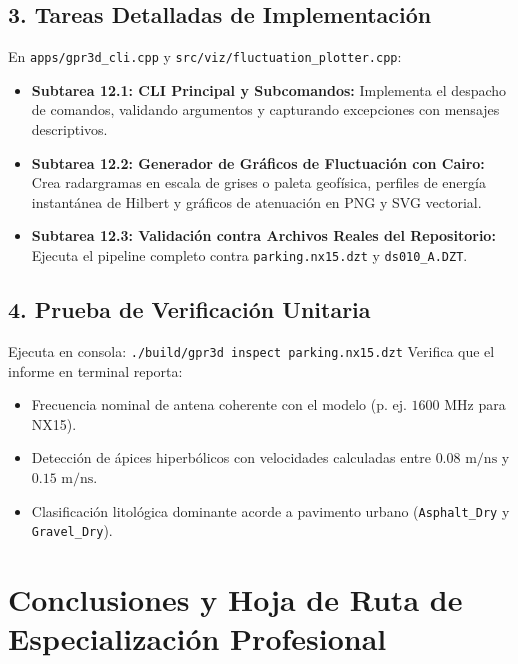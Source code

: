 \documentclass[11pt,a4paper]{article}
\begin{document}
\subsection{3. Tareas Detalladas de Implementación}
En \texttt{apps/gpr3d\_cli.cpp} y \texttt{src/viz/fluctuation\_plotter.cpp}:
\begin{itemize}
    \item \textbf{Subtarea 12.1: CLI Principal y Subcomandos:}
    Implementa el despacho de comandos, validando argumentos y capturando excepciones con mensajes descriptivos.
    \item \textbf{Subtarea 12.2: Generador de Gráficos de Fluctuación con Cairo:}
    Crea radargramas en escala de grises o paleta geofísica, perfiles de energía instantánea de Hilbert y gráficos de atenuación en PNG y SVG vectorial.
    \item \textbf{Subtarea 12.3: Validación contra Archivos Reales del Repositorio:}
    Ejecuta el pipeline completo contra \texttt{parking.nx15.dzt} y \texttt{ds010\_A.DZT}.
\end{itemize}

\subsection{4. Prueba de Verificación Unitaria}
Ejecuta en consola:
\texttt{./build/gpr3d inspect parking.nx15.dzt}
Verifica que el informe en terminal reporta:
\begin{itemize}
    \item Frecuencia nominal de antena coherente con el modelo (p. ej. $1600\text{ MHz}$ para NX15).
    \item Detección de ápices hiperbólicos con velocidades calculadas entre $0.08\text{ m/ns}$ y $0.15\text{ m/ns}$.
    \item Clasificación litológica dominante acorde a pavimento urbano (\texttt{Asphalt\_Dry} y \texttt{Gravel\_Dry}).
\end{itemize}

\section{Conclusiones y Hoja de Ruta de Especialización Profesional}
\end{document}
